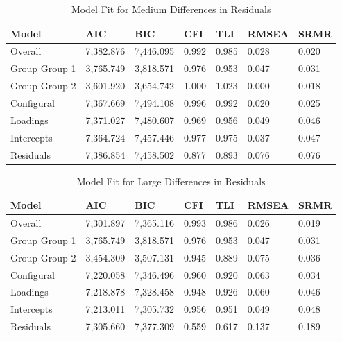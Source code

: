 \documentclass[
  man]{apa7}
\begin{document}
\begin{table}[tbp]

\begin{center}
\begin{threeparttable}

\caption{\label{tab:tab9}Model Fit for Medium Differences in Residuals}

\begin{tabular}{lllllll}
\toprule
Model & AIC & BIC & CFI & TLI & RMSEA & SRMR\\
\midrule
Overall & 7,382.876 & 7,446.095 & 0.992 & 0.985 & 0.028 & 0.020\\
Group Group 1 & 3,765.749 & 3,818.571 & 0.976 & 0.953 & 0.047 & 0.031\\
Group Group 2 & 3,601.920 & 3,654.742 & 1.000 & 1.023 & 0.000 & 0.018\\
Configural & 7,367.669 & 7,494.108 & 0.996 & 0.992 & 0.020 & 0.025\\
Loadings & 7,371.027 & 7,480.607 & 0.969 & 0.956 & 0.049 & 0.046\\
Intercepts & 7,364.724 & 7,457.446 & 0.977 & 0.975 & 0.037 & 0.047\\
Residuals & 7,386.854 & 7,458.502 & 0.877 & 0.893 & 0.076 & 0.076\\
\bottomrule
\end{tabular}

\end{threeparttable}
\end{center}

\end{table}

\begin{table}[tbp]

\begin{center}
\begin{threeparttable}

\caption{\label{tab:tab10}Model Fit for Large Differences in Residuals}

\begin{tabular}{lllllll}
\toprule
Model & AIC & BIC & CFI & TLI & RMSEA & SRMR\\
\midrule
Overall & 7,301.897 & 7,365.116 & 0.993 & 0.986 & 0.026 & 0.019\\
Group Group 1 & 3,765.749 & 3,818.571 & 0.976 & 0.953 & 0.047 & 0.031\\
Group Group 2 & 3,454.309 & 3,507.131 & 0.945 & 0.889 & 0.075 & 0.036\\
Configural & 7,220.058 & 7,346.496 & 0.960 & 0.920 & 0.063 & 0.034\\
Loadings & 7,218.878 & 7,328.458 & 0.948 & 0.926 & 0.060 & 0.046\\
Intercepts & 7,213.011 & 7,305.732 & 0.956 & 0.951 & 0.049 & 0.048\\
Residuals & 7,305.660 & 7,377.309 & 0.559 & 0.617 & 0.137 & 0.189\\
\bottomrule
\end{tabular}

\end{threeparttable}
\end{center}

\end{table}
\end{document}
